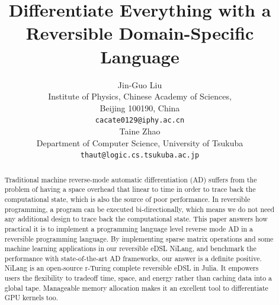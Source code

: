 \documentclass{article}
\newcommand{\<}{\langle}
\renewcommand{\>}{\rangle}
\theoremstyle{definition}\newtheorem{definition}{\textit{Definition}}
\begin{document}
\title{Differentiate Everything with a Reversible Domain-Specific Language}

\author{Jin-Guo Liu\\
Institute of Physics, Chinese Academy of Sciences,\\Beijing 100190, China\\
\texttt{cacate0129@iphy.ac.cn}\\
\And
Taine Zhao\\
Department of Computer Science, University of Tsukuba\\
\texttt{thaut@logic.cs.tsukuba.ac.jp}\\
}



\maketitle

\begin{abstract}
Traditional machine reverse-mode automatic differentiation (AD) suffers from the problem of having a space overhead that linear to time in order to trace back the computational state, which is also the source of poor performance. In reversible programming, a program can be executed bi-directionally, which means we do not need any additional design to trace back the computational state. This paper answers how practical it is to implement a programming language level reverse mode AD in a reversible programming language. By implementing sparse matrix operations and some machine learning applications in our reversible eDSL NiLang, and benchmark the performance with state-of-the-art AD frameworks, our answer is a definite positive.
NiLang is an open-source r-Turing complete reversible eDSL in Julia. It empowers users the flexibility to tradeoff time, space, and energy rather than caching data into a global tape. Manageable memory allocation makes it an excellent tool to differentiate GPU kernels too.
\end{abstract}
\end{document}
